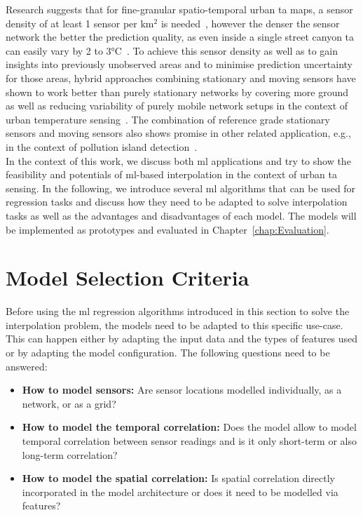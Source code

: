 Research suggests that for fine-granular spatio-temporal urban \gls{ta} maps, a sensor density of at least 1 sensor per km$^{2}$ is needed~\cite{venter2020hyperlocal}, however the denser the sensor network the better the prediction quality, as even inside a single street canyon \gls{ta} can easily vary by 2 to 3°C~\cite{sugawara2008temperature}.
To achieve this sensor density as well as to gain insights into previously unobserved areas and to minimise prediction uncertainty for those areas, hybrid approaches combining stationary and moving sensors have shown to work better than purely stationary networks by covering more ground as well as reducing variability of purely mobile network setups in the context of urban temperature sensing~\cite{yang2019designing}. The combination of reference grade stationary sensors and moving sensors also shows promise in other related application, e.g., in the context of pollution island detection~\cite{iyer2022modeling}.\\
In the context of this work, we discuss both \gls{ml} applications and try to show the feasibility and potentials of \gls{ml}-based interpolation in the context of urban \gls{ta} sensing.
In the following, we introduce several \gls{ml} algorithms that can be used for regression tasks and discuss how they need to be adapted to solve interpolation tasks as well as the advantages and disadvantages of each model. The models will be implemented as prototypes and evaluated in Chapter~\ref{chap:Evaluation}.

\section{Model Selection Criteria}
\label{sec: model selection criteria}

Before using the \gls{ml} regression algorithms introduced in this section to solve the interpolation problem, the models need to be adapted to this specific use-case. This can happen either by adapting the input data and the types of features used or by adapting the model configuration. The following questions need to be answered:

\begin{itemize}
    \item \textbf{How to model sensors:} Are sensor locations modelled individually, as a network, or as a grid?
    \item \textbf{How to model the temporal correlation:} Does the model allow to model temporal correlation between sensor readings and is it only short-term or also long-term correlation?
    \item \textbf{How to model the spatial correlation:} Is spatial correlation directly incorporated in the model architecture or does it need to be modelled via features?
\end{itemize}

